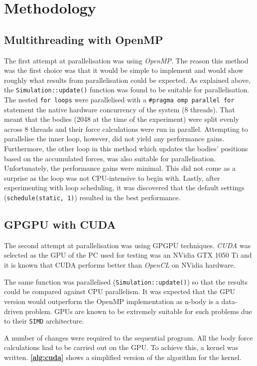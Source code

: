 \documentclass[12pt, a4paper]{article}
\begin{document}
    \section{Methodology}      
    \subsection{Multithreading with OpenMP}
    The first attempt at parallelisation was using \textit{OpenMP}. The reason this method was the first choice was that it would be simple to implement and would show roughly what results from parallelisation could be expected. As explained above, the \texttt{Simulation::update()} function was found to be suitable for parallelisation. The nested \texttt{for loops} were parallelised with a \lstinline{#pragma omp parallel for} statement the native hardware concurrency of the system (8 threads). That meant that the bodies (2048 at the time of the experiment) were split evenly across 8 threads and their force calculations were run in parallel. Attempting to parallelise the inner loop, however, did not yield any performance gains. Furthermore, the other loop in this method which updates the bodies' positions based on the accumulated forces, was also suitable for parallelisation. Unfortunately, the performance gains were minimal. This did not come as a surprise as the loop was not CPU-intensive to begin with. Lastly, after experimenting with loop scheduling, it was discovered that the default settings (\lstinline{schedule(static, 1)}) resulted in the best performance.

    \subsection{GPGPU with CUDA}
    The second attempt at parallelisation was using GPGPU techniques. \textit{CUDA} was selected as the GPU of the PC used for testing was an NVidia GTX 1050 Ti and it is known that CUDA performs better than \textit{OpenCL} on NVidia hardware. 

    The same function was parallelised (\texttt{Simulation::update()}) so that the results could be compared against CPU parallelism. It was expected that the GPU version would outperform the OpenMP implementation as n-body is a data-driven problem. GPUs are known to be extremely suitable for such problems due to their \texttt{SIMD} architecture.

    A number of changes were required to the sequential program. All the body force calculations had to be carried out on the GPU. To achieve this, a kernel was written. \textbf{\cref{alg:cuda}} shows a simplified version of the algorithm for the kernel.
\end{document}
